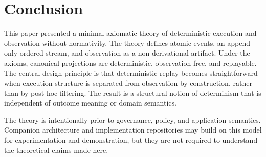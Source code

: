 \section{Conclusion}

This paper presented a minimal axiomatic theory of deterministic execution and observation without normativity. The theory defines atomic events, an append-only ordered stream, and observation as a non-derivational artifact. Under the axioms, canonical projections are deterministic, observation-free, and replayable. The central design principle is that deterministic replay becomes straightforward when execution structure is separated from observation by construction, rather than by post-hoc filtering. The result is a structural notion of determinism that is independent of outcome meaning or domain semantics.

The theory is intentionally prior to governance, policy, and application semantics. Companion architecture and implementation repositories may build on this model for experimentation and demonstration, but they are not required to understand the theoretical claims made here.
